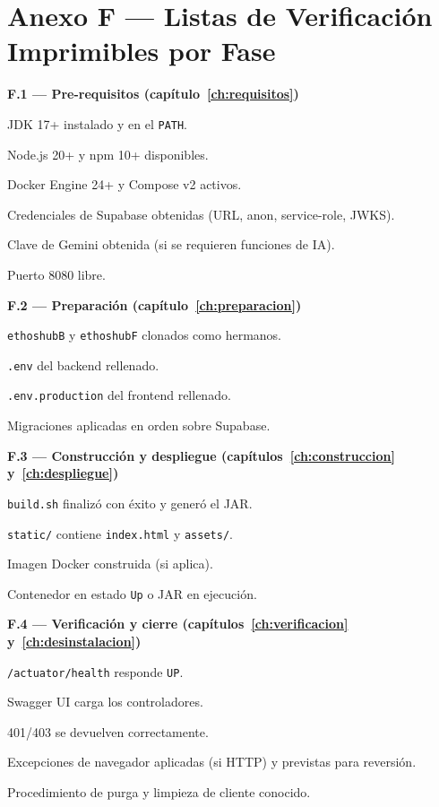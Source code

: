 \section{Anexo F — Listas de Verificación Imprimibles por Fase}%
\label{sec:anexo-checklists}

\textbf{F.1 — Pre-requisitos (capítulo~\ref{ch:requisitos})}\par
\begin{checklist}
    \item JDK 17+ instalado y en el \texttt{PATH}.
    \item Node.js 20+ y npm 10+ disponibles.
    \item Docker Engine 24+ y Compose v2 activos.
    \item Credenciales de Supabase obtenidas (URL, anon, service-role, JWKS).
    \item Clave de Gemini obtenida (si se requieren funciones de IA).
    \item Puerto 8080 libre.
\end{checklist}

\textbf{F.2 — Preparación (capítulo~\ref{ch:preparacion})}\par
\begin{checklist}
    \item \texttt{ethoshubB} y \texttt{ethoshubF} clonados como hermanos.
    \item \texttt{.env} del backend rellenado.
    \item \texttt{.env.production} del frontend rellenado.
    \item Migraciones aplicadas en orden sobre Supabase.
\end{checklist}

\textbf{F.3 — Construcción y despliegue (capítulos~\ref{ch:construccion} y~\ref{ch:despliegue})}\par
\begin{checklist}
    \item \texttt{build.sh} finalizó con éxito y generó el JAR.
    \item \texttt{static/} contiene \texttt{index.html} y \texttt{assets/}.
    \item Imagen Docker construida (si aplica).
    \item Contenedor en estado \texttt{Up} o JAR en ejecución.
\end{checklist}

\textbf{F.4 — Verificación y cierre (capítulos~\ref{ch:verificacion} y~\ref{ch:desinstalacion})}\par
\begin{checklist}
    \item \texttt{/actuator/health} responde \texttt{UP}.
    \item Swagger UI carga los controladores.
    \item 401/403 se devuelven correctamente.
    \item Excepciones de navegador aplicadas (si HTTP) y previstas para reversión.
    \item Procedimiento de purga y limpieza de cliente conocido.
\end{checklist}

